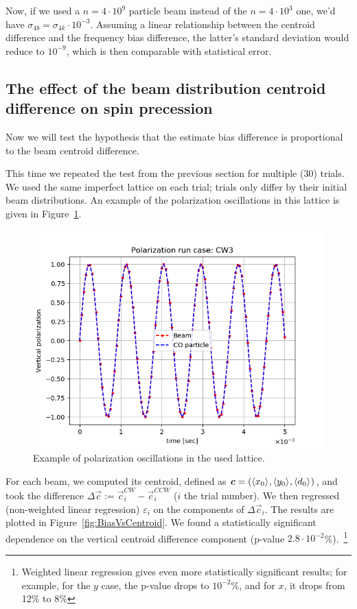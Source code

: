 \documentclass{article}
\begin{document}
Now, if we used a $n = 4\cdot10^{9}$ particle beam instead of the $n = 4\cdot10^{3}$ one, we'd have $\sigma_{4b} = \sigma_{4k}\cdot10^{-3}$. Assuming a linear relationship between the centroid difference and the frequency bias difference, the latter's standard deviation would reduce to $10^{-9}$, which is then comparable with statistical error.

\subsection{The effect of the beam distribution centroid difference on spin precession}

Now we will test the hypothesis that the estimate bias difference is proportional to the beam centroid difference. 

This time we repeated the test from the previous section for multiple (30) trials. We used the same imperfect lattice on each trial; trials only differ by their initial beam distributions. An example of the polarization oscillations in this lattice is given in Figure~\ref{fig:OscEx}.

\begin{figure}[!h]
  \centering
  \includegraphics[width=\linewidth]{img/spin_axis_motion/smp30_Py_oscillations_vs_time}
  \caption{Example of polarization oscillations in the used lattice.\label{fig:OscEx}}
\end{figure}


For each beam, we computed its centroid, defined as $\vec c = (\avg{x_0}, \avg{y_0}, \avg{d_0})$, and took the difference $\Delta\vec c := \vec c^{CW}_i - \vec c^{CCW}_i$ ($i$ the trial number). We then regressed (non-weighted linear regression) $\varepsilon_i$ on the components of $\Delta\vec c_i$. The results are plotted in Figure~\ref{fig:BiasVsCentroid}. We found a statistically significant dependence on the vertical centroid difference component (p-value $2.8\cdot 10^{-2}$\%).~\footnote{Weighted linear regression gives even more statistically significant results; for example, for the $y$ case, the p-value drops to $10^{-2}\%$, and for $x$, it drops from 12\% to 8\%}
\end{document}

